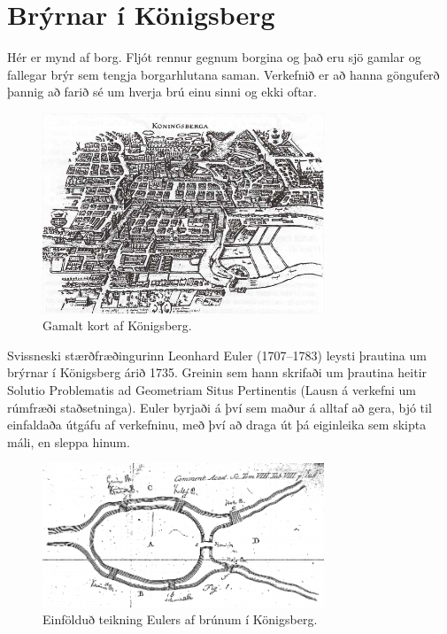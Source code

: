 \documentclass[b5paper,12pt]{book}
\begin{document}



\section{Brýrnar í Königsberg}
Hér er mynd af borg. Fljót rennur gegnum borgina og það eru sjö gamlar og fallegar brýr sem tengja borgarhlutana saman. Verkefnið er að hanna gönguferð þannig að farið sé um hverja brú einu sinni og ekki oftar.  

\begin{figure}[h]
  \includegraphics[width=0.75\textwidth, center]{koningbryr.jpg}
  \caption*{Gamalt kort af Königsberg.}
\end{figure}

\noindent
Svissneski stærðfræðingurinn Leonhard Euler (1707–1783) leysti þrautina um brýrnar í Königsberg árið 1735. Greinin sem hann skrifaði um þrautina heitir Solutio Problematis ad Geometriam Situs Pertinentis (Lausn á verkefni um rúmfræði staðsetninga). Euler byrjaði á því sem maður á alltaf að gera, bjó til einfaldaða útgáfu af verkefninu, með því að draga út þá eiginleika sem skipta máli, en sleppa hinum. 

\begin{figure}[h]
  \includegraphics[width=0.75\textwidth, center]{konigsb_euler.png}
   \caption*{Einfölduð teikning Eulers af brúnum í Königsberg.}
\end{figure}
\end{document}
